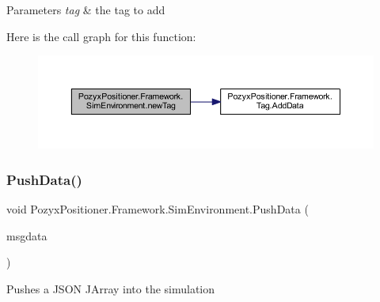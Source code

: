 \begin{DoxyParams}{Parameters}
{\em tag} & the tag to add\\
\hline
\end{DoxyParams}
Here is the call graph for this function\+:
\nopagebreak
\begin{figure}[H]
\begin{center}
\leavevmode
\includegraphics[width=350pt]{class_pozyx_positioner_1_1_framework_1_1_sim_environment_ae804be21b53900cbac13c0cce385b170_cgraph}
\end{center}
\end{figure}
\mbox{\label{class_pozyx_positioner_1_1_framework_1_1_sim_environment_a94e341475ddb03c2c27dd253748ad65a}} 
\subsubsection{\texorpdfstring{Push\+Data()}{PushData()}}
{\footnotesize\ttfamily void Pozyx\+Positioner.\+Framework.\+Sim\+Environment.\+Push\+Data (\begin{DoxyParamCaption}\item[{J\+Array}]{msgdata }\end{DoxyParamCaption})}



Pushes a J\+S\+ON J\+Array into the simulation 


